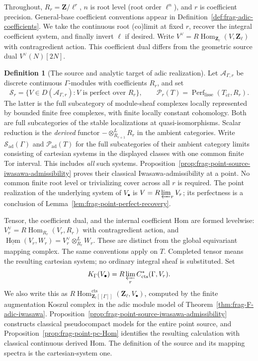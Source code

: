 \documentclass[11pt]{article}
\theoremstyle{definition}
\newtheorem{definition}[theorem]{Definition}
\theoremstyle{remark}
\begin{document}
Throughout, $R_r=\mathbf Z/\ell^r$, $n$ is root level (root order
$\ell^n$), and $r$ is coefficient precision.  General-base coefficient
conventions appear in Definition~\ref{def:frag-adic-coefficients}.
We take the continuous root (co)limit at fixed $r$, recover the
integral coefficient system, and finally invert $\ell$ if desired.
Write $V^\vee=R\operatorname{Hom}_{\mathbf Z_\ell}(V,\mathbf Z_\ell)$
with contragredient action.  This coefficient dual differs from the
geometric source dual $V^\vee(N)[2N]$.

\begin{definition}[The source and analytic target of adic realization]
\label{def:frag-local-adic-source-target}
Let $\mathcal A_{\Gamma,r}$ be discrete continuous $\Gamma$-modules
with coefficients $R_r$, and set
\[
 \mathcal S_r=\{V\in D(\mathcal A_{\Gamma,r}):
                    V\text{ is perfect over }R_r\},\qquad
 \mathcal P_r(T)=\operatorname{Perf}_{\mathrm{lisse}}(T_{\acute et},R_r).
\]
The latter is the full subcategory of module-sheaf complexes locally
represented by bounded finite free complexes, with finite locally
constant cohomology.  Both are full subcategories of the stable
localizations at quasi-isomorphisms.  Scalar reduction is the
\emph{derived} functor $-\otimes^L_{R_{r+1}}R_r$ in the ambient categories.
Write $\mathcal S_{\mathrm{ad}}(\Gamma)$ and
$\mathcal P_{\mathrm{ad}}(T)$ for the full subcategories of their
ambient category limits consisting of cartesian systems in the
displayed classes with one common finite Tor interval.  This
includes \emph{all} such systems.  Proposition~\ref{prop:frag-point-source-iwasawa-admissibility}
proves their classical Iwasawa-admissibility at a point.  No common
finite root level or trivializing cover across all $r$ is required.
The point realization of the underlying system of $V_\bullet$ is
$V=R\varprojlim_rV_r$; its perfectness is a conclusion of
Lemma~\ref{lem:frag-point-perfect-recovery}.

Tensor, the coefficient dual, and the internal coefficient Hom are
formed levelwise: $V_r^\vee=R\operatorname{Hom}_{R_r}(V_r,R_r)$ with
contragredient action, and
$\underline{\operatorname{Hom}}(V_r,W_r)=V_r^\vee\otimes^L_{R_r}W_r$.
These are distinct from the global equivariant mapping complex.
The same conventions apply on $T$.  Completed tensor means the
resulting cartesian system; no ordinary integral sheaf is substituted.
Set
\[
 K_\Gamma(V_\bullet)=R\varprojlim_r C^*_{\mathrm{cts}}(\Gamma,V_r).
\]
We also write this as
$R\operatorname{Hom}^{\mathrm{cts}}_{\mathbf Z_\ell[[\Gamma]]}
(\mathbf Z_\ell,V_\bullet)$, computed by the finite augmentation
Koszul complex in the adic module model of
Theorem~\ref{thm:frag-F-adic-iwasawa}.  Proposition~\ref{prop:frag-point-source-iwasawa-admissibility} constructs
classical pseudocompact models for the entire point source, and
Proposition~\ref{prop:frag-point-pc-Hom} identifies the resulting
calculation with classical continuous derived Hom.  The definition
of the source and its mapping spectra is the cartesian-system one.
\end{definition}
\end{document}
